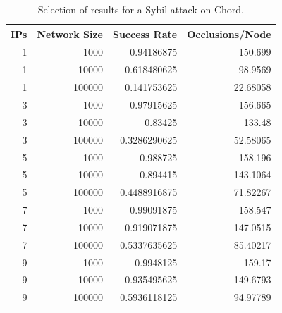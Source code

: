 \documentclass[11pt,conference]{IEEEtran}
\begin{document}
\begin{table}\small
    
        \caption{Selection of results for a Sybil attack on Chord.} %
        \label{tab:exp3}
        
        \begin{tabular}{|r|r|r|r|}
            \hline 
            IPs & Network Size &   Success Rate & Occlusions/Node \\ \hline
            1 & 1000 & 0.94186875 & 150.699 \\ \hline
            1 & 10000 & 0.618480625 & 98.9569 \\ \hline
            1 & 100000 & 0.141753625 & 22.68058 \\ \hline
            3 & 1000 & 0.97915625 & 156.665 \\ \hline
            3 & 10000 & 0.83425 & 133.48 \\ \hline
            3 & 100000 & 0.3286290625 & 52.58065 \\ \hline
            5 & 1000 & 0.988725 & 158.196 \\ \hline
            5 & 10000 & 0.894415 & 143.1064 \\ \hline
            5 & 100000 & 0.4488916875 & 71.82267 \\ \hline
            7 & 1000 & 0.99091875 & 158.547 \\ \hline
            7 & 10000 & 0.919071875 & 147.0515 \\ \hline
            7 & 100000 & 0.5337635625 & 85.40217 \\ \hline
            9 & 1000 & 0.9948125 & 159.17 \\ \hline
            9 & 10000 & 0.935495625 & 149.6793 \\ \hline
            9 & 100000 & 0.5936118125 & 94.97789 \\ \hline
            
            
        \end{tabular}
        
        
    
\end{table}
\end{document}
